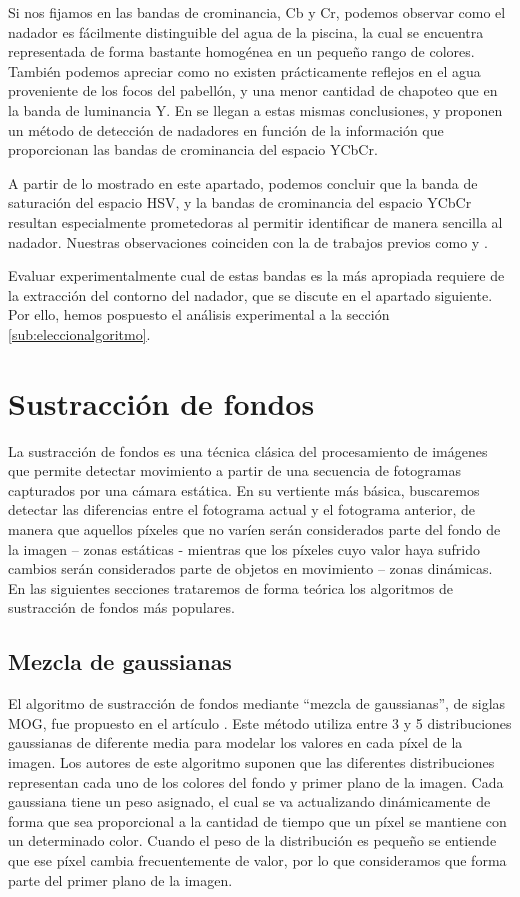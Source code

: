 Si nos fijamos en las bandas de crominancia, Cb y Cr, podemos observar como el nadador es fácilmente distinguible del agua de la piscina, la cual se encuentra representada de forma bastante homogénea en un pequeño rango de colores. También podemos apreciar como no existen prácticamente reflejos en el agua proveniente de los focos del pabellón, y una menor cantidad de chapoteo que en la banda de luminancia Y. En \cite{swimmerartii} se llegan a estas mismas conclusiones, y proponen un método de detección de nadadores en función de la información que proporcionan las bandas de crominancia del espacio YCbCr.

A partir de lo mostrado en este apartado, podemos concluir que la banda de saturación del espacio HSV, y la bandas de crominancia del espacio YCbCr resultan especialmente prometedoras al permitir identificar de manera sencilla al nadador. Nuestras observaciones coinciden con la de trabajos previos como \cite{hsvforswimmerdetection} y \cite{swimmerartii}.

Evaluar experimentalmente cual de estas bandas es la más apropiada requiere de la extracción del contorno del nadador, que se discute en el apartado siguiente. Por ello, hemos pospuesto el análisis experimental a la sección \ref{sub:eleccionalgoritmo}.

\section{Sustracción de fondos} 

La sustracción de fondos es una técnica clásica del procesamiento de imágenes que permite detectar movimiento a partir de una secuencia de fotogramas capturados por una cámara estática. En su vertiente más básica, buscaremos detectar las diferencias entre el fotograma actual y el fotograma anterior, de manera que aquellos píxeles que no varíen serán considerados parte del fondo de la imagen – zonas estáticas - mientras que los píxeles cuyo valor haya sufrido cambios serán considerados parte de objetos en movimiento – zonas dinámicas. En las siguientes secciones trataremos de forma teórica los algoritmos de sustracción de fondos más populares.

\subsection{Mezcla de gaussianas}

El algoritmo de sustracción de fondos mediante “mezcla de gaussianas”, de siglas MOG, fue propuesto en el artículo \cite{origenmog}. Este método utiliza entre 3 y 5 distribuciones gaussianas de diferente media para modelar los valores en cada píxel de la imagen. Los autores de este algoritmo suponen que las diferentes distribuciones representan cada uno de los colores del fondo y primer plano de la imagen. Cada gaussiana tiene un peso asignado, el cual se va actualizando dinámicamente de forma que sea proporcional a la cantidad de tiempo que un píxel se mantiene con un determinado color. Cuando el peso de la distribución es pequeño se entiende que ese píxel cambia frecuentemente de valor, por lo que consideramos que forma parte del primer plano de la imagen.

